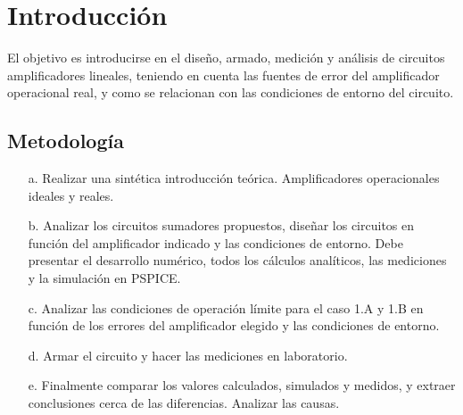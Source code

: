 \documentclass{article}
\begin{document}
\renewcommand{\figureautorefname}{Fig.}
\renewcommand{\tableautorefname}{Tab.}
\renewcommand{\equationautorefname}{Ec.}

\pagestyle{fancy}
\fancyhf{}
\fancyfoot[R]{\thepage}
\renewcommand{\headrulewidth}{0.1pt}


\newpage

\tableofcontents
\newpage



\section{Introducción}
El objetivo es introducirse en el diseño, armado, medición y análisis de circuitos amplificadores lineales, teniendo en cuenta las fuentes de error del amplificador operacional real, y como se relacionan con las condiciones de entorno del circuito.

\subsection*{Metodología}

\begin{itemize}
\item[a.] Realizar una sintética introducción teórica. Amplificadores operacionales ideales y reales.
\item[b.] Analizar los circuitos sumadores propuestos, diseñar los circuitos en función del amplificador indicado y las condiciones de entorno. Debe presentar el desarrollo numérico, todos los cálculos analíticos, las mediciones y la simulación en PSPICE.
\item[c.] Analizar las condiciones de operación límite para el caso 1.A y 1.B en función de los errores del amplificador elegido y las condiciones de entorno.
\item[d.] Armar el circuito y hacer las mediciones en laboratorio.
\item[e.] Finalmente comparar los valores calculados, simulados y medidos, y extraer conclusiones cerca de las diferencias. Analizar las causas.
\end{itemize}
\end{document}
